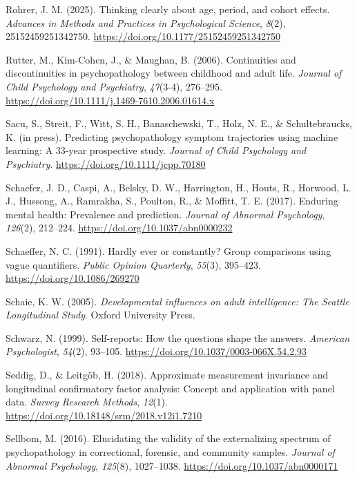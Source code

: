 \documentclass[
  american,
  letterpaper,
  12pt]{article}
\newlength{\cslhangindent}
\newenvironment{CSLReferences}[2] %
 {\begin{list}{}{%
  \setlength{\itemindent}{0pt}
  \setlength{\leftmargin}{0pt}
  \setlength{\parsep}{0pt}
  \ifodd #1
   \setlength{\leftmargin}{\cslhangindent}
   \setlength{\itemindent}{-1\cslhangindent}
  \fi
  \setlength{\itemsep}{#2\baselineskip}}}
 {\end{list}}
\begin{document}
\begin{CSLReferences}{1}{0}
Rohrer, J. M. (2025). Thinking clearly about age, period, and cohort
effects. \emph{Advances in Methods and Practices in Psychological
Science}, \emph{8}(2), 25152459251342750.
\url{https://doi.org/10.1177/25152459251342750}

Rutter, M., Kim-Cohen, J., \& Maughan, B. (2006). Continuities and
discontinuities in psychopathology between childhood and adult life.
\emph{Journal of Child Psychology and Psychiatry}, \emph{47}(3-4),
276--295. \url{https://doi.org/10.1111/j.1469-7610.2006.01614.x}

Sacu, S., Streit, F., Witt, S. H., Banaschewski, T., Holz, N. E., \&
Schultebraucks, K. (in press). Predicting psychopathology symptom
trajectories using machine learning: {A} 33-year prospective study.
\emph{Journal of Child Psychology and Psychiatry}.
\url{https://doi.org/10.1111/jcpp.70180}

Schaefer, J. D., Caspi, A., Belsky, D. W., Harrington, H., Houts, R.,
Horwood, L. J., Hussong, A., Ramrakha, S., Poulton, R., \& Moffitt, T.
E. (2017). Enduring mental health: {Prevalence} and prediction.
\emph{Journal of Abnormal Psychology}, \emph{126}(2), 212--224.
\url{https://doi.org/10.1037/abn0000232}

Schaeffer, N. C. (1991). Hardly ever or constantly? {Group} comparisons
using vague quantifiers. \emph{Public Opinion Quarterly}, \emph{55}(3),
395--423. \url{https://doi.org/10.1086/269270}

Schaie, K. W. (2005). \emph{Developmental influences on adult
intelligence: {The} {Seattle Longitudinal Study}}. Oxford University
Press.

Schwarz, N. (1999). Self-reports: {How} the questions shape the answers.
\emph{American Psychologist}, \emph{54}(2), 93--105.
\url{https://doi.org/10.1037/0003-066X.54.2.93}

Seddig, D., \& Leitgöb, H. (2018). Approximate measurement invariance
and longitudinal confirmatory factor analysis: {Concept} and application
with panel data. \emph{Survey Research Methods}, \emph{12}(1).
\url{https://doi.org/10.18148/srm/2018.v12i1.7210}

Sellbom, M. (2016). Elucidating the validity of the externalizing
spectrum of psychopathology in correctional, forensic, and community
samples. \emph{Journal of Abnormal Psychology}, \emph{125}(8),
1027--1038. \url{https://doi.org/10.1037/abn0000171}


\end{CSLReferences}
\end{document}
